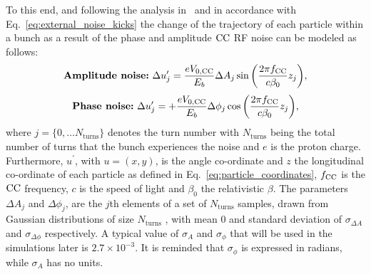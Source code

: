 To this end, and following the analysis in~\cite{PhysRevSTAB.18.101001} and in accordance with Eq.~\eqref{eq:external_noise_kicks} the change of the trajectory of each particle within a bunch as a result of the phase and amplitude ${\mathrm{CC}}$ RF noise can be modeled as follows:
\begin{equation}\label{eq:amplitude_noise_kick}
    \textbf{\textrm{Amplitude noise:}} \ \Delta u^\prime_{j} =  \frac{e {V_\mathrm{0, CC}}}{E_b} \Delta A_j \sin{\left (  \frac{2 \pi {f_\mathrm{CC}}}{c \beta_0}z_j   \right )},
  \end{equation}
  \begin{equation}\label{eq:phase_noise_kick}
      \textbf{\textrm{Phase noise:}} \ \Delta u^\prime_{j} = +  \frac{e {V_\mathrm{0, CC}}}{E_b} \Delta \phi_j  \cos{\left (  \frac{2 \pi {f_\mathrm{CC}}}{c \beta_0}z_j   \right )},
  \end{equation}
where $j=\{ 0,\dots N_\mathrm{turns} \}$ denotes the turn number with $N_\mathrm{turns}$ being the total number of turns that the bunch experiences the noise and $e$ is the proton charge. Furthermore, $u^\prime$, with $u=(x,y)$, is the angle co-ordinate and $z$ the longitudinal co-ordinate of each particle as defined in Eq.~\eqref{eq:particle_coordinates}, ${f_\mathrm{CC}}$ is the ${\mathrm{CC}}$ frequency, $c$ is the speed of light and $\beta_0$ the relativistic $\beta$. The parameters $\Delta A_j$ and $\Delta \phi_j$, are the $j$th elements of a set of $N_\mathrm{turns}$ samples, drawn from Gaussian distributions of size $N_\mathrm{turns}$ , with mean 0 and standard deviation of $\sigma_{\Delta A}$ and $\sigma_{\Delta \phi}$ respectively. A typical value of $\sigma_A$ and $\sigma_\phi$ that will be used in the simulations later is $2.7 \times 10^{-3}$.  It is reminded that $\sigma_\phi$ is expressed in radians, while $\sigma_A$ has no units.

